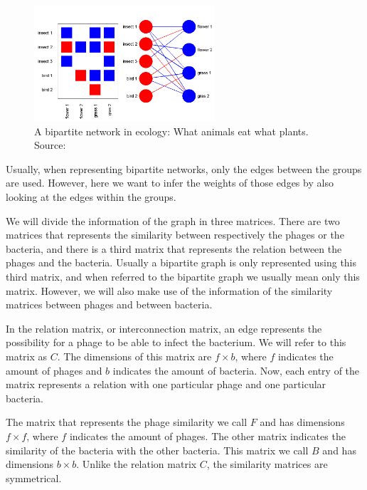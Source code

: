 \documentclass{article}
\begin{document}

\begin{figure}[ht]
    \centering
    \includegraphics[width=0.6\textwidth]{img/bipartite_class_01.png}
    \caption{A bipartite network in ecology: What animals eat what plants. Source:~\cite{flores2016bimat}}\label{fig:networkecology}
\end{figure}

Usually, when representing bipartite networks, only the edges between the groups
are used. However, here we want to infer the weights of those edges by also 
looking at the edges within the groups.

We will divide the information of the graph in three matrices. 
There are two matrices that represents the similarity between respectively
the phages or the bacteria, and there is a third matrix that represents the
relation between the phages and the bacteria. Usually a bipartite graph is
only represented using this third matrix, and when referred to the bipartite graph
we usually mean only this matrix. However, we will also make use 
of the information of the similarity matrices between phages and between bacteria.

In the relation matrix, or interconnection matrix, 
an edge represents the possibility for a phage to be able to infect the bacterium. 
We will refer to this matrix as $C$. The dimensions of this matrix are
$f \times b$, where $f$ indicates the amount of phages and $b$ indicates the amount
of bacteria. Now, each entry of the matrix represents a relation with one particular
phage and one particular bacteria. 

The matrix that represents the phage similarity we call $F$ and has dimensions $f \times f$,
where $f$ indicates the 
amount of phages. The other matrix indicates the similarity
of the bacteria with the other bacteria. This matrix we call $B$ and has
dimensions $b \times b$. Unlike the relation matrix $C$, the similarity matrices
are symmetrical. 
\end{document}
